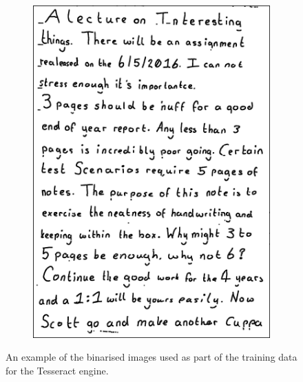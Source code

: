 {\begin{figure}[H]
  \begin{subfigure}[h]{0.35\textwidth}
    \includegraphics[scale=0.1]{images/training_data_2}
    \caption{}
    \label{fig:second_tesseract}
  \end{subfigure}

  \caption{An example of the binarised images used as part of the training data for the Tesseract engine.}
  \label{fig:tesseract_training data}

\end{figure}

}
